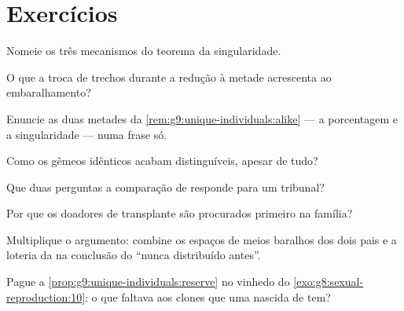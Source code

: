 \section{Exercícios}

\begin{exercise}[$\star$]\label{exo:g9:unique-individuals:1}
Nomeie os três mecanismos do teorema da singularidade.
\end{exercise}

\begin{exercise}[$\star$]\label{exo:g9:unique-individuals:2}
O que a troca de trechos durante a redução à metade
acrescenta ao embaralhamento?
\end{exercise}

\begin{exercise}[$\star$]\label{exo:g9:unique-individuals:3}
Enuncie as duas metades da
\cref{rem:g9:unique-individuals:alike} --- a porcentagem e a
singularidade --- numa frase só.
\end{exercise}

\begin{exercise}[$\star$]\label{exo:g9:unique-individuals:4}
Como os gêmeos idênticos acabam distinguíveis, apesar de tudo?
\end{exercise}

\begin{exercise}[$\star$]\label{exo:g9:unique-individuals:5}
Que duas perguntas a comparação de  responde para um
tribunal?
\end{exercise}

\begin{exercise}[$\star$]\label{exo:g9:unique-individuals:6}
Por que os doadores de transplante são procurados primeiro na
família?
\end{exercise}

\begin{exercise}[$\star\star$]\label{exo:g9:unique-individuals:7}
Multiplique o argumento: combine os espaços de meios baralhos
dos dois pais e a loteria da  na conclusão do
``nunca distribuído antes''.
\end{exercise}

\begin{exercise}[$\star\star$]\label{exo:g9:unique-individuals:8}
Pague a \cref{prop:g9:unique-individuals:reserve} no vinhedo
do \cref{exo:g8:sexual-reproduction:10}: o que faltava aos
clones que uma  nascida de  tem?
\end{exercise}

